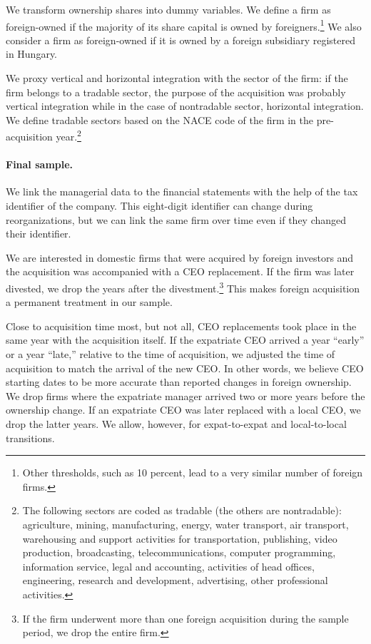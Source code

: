 \documentclass[12pt,a4paper]{article}
\begin{document}
We transform ownership shares into dummy variables. We define a firm as foreign-owned if the majority of its share capital is owned by foreigners.\footnote{Other thresholds, such as 10 percent, lead to a very similar number of foreign firms.} We also consider a firm as foreign-owned if it is owned by a foreign subsidiary registered in Hungary.

We proxy vertical and horizontal integration with the sector of the firm: if the firm belongs to a tradable sector, the purpose of the acquisition was probably vertical integration while in the case of nontradable sector, horizontal integration. We define tradable sectors based on the NACE code of the firm in the pre-acquisition year.\footnote{The following sectors are coded as tradable (the others are nontradable): agriculture, mining, manufacturing, energy, water transport, air transport, warehousing and support activities for transportation, publishing, video production, broadcasting, telecommunications, computer programming, information service, legal and accounting, activities of head offices, engineering, research and development, advertising, other professional activities.}

\paragraph{Final sample.} We link the managerial data to the financial statements with the help of the tax identifier of the company. This eight-digit identifier can change during reorganizations, but we can link the same firm over time even if they changed their identifier.

We are interested in domestic firms that were acquired by foreign investors and the acquisition was accompanied with a CEO replacement. If the firm was later divested, we drop the years after the divestment.\footnote{If the firm underwent more than one foreign acquisition during the sample period, we drop the entire firm.} This makes foreign acquisition a permanent treatment in our sample.  

Close to acquisition time most, but not all, CEO replacements took place in the same year with the acquisition itself. If the expatriate CEO arrived a year ``early'' or a year ``late,'' relative to the time of acquisition, we adjusted the time of acquisition to match the arrival of the new CEO. In other words, we believe CEO starting dates to be more accurate than reported changes in foreign ownership. We drop firms where the expatriate manager arrived two or more years before the ownership change. If an expatriate CEO was later replaced with a local CEO, we drop the latter years. We allow, however, for expat-to-expat and local-to-local transitions. 
\end{document}
